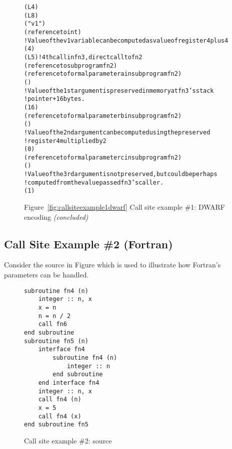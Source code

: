 \begin{figure}
\begin{dwflisting}
\begin{alltt}
\DWTAGlexicalblock
    \DWATlowpc(L4)
    \DWAThighpc(L8)
    \DWTAGvariable
        \DWATname("v1")
        \DWATtype(reference to int)
        ! Value of the v1 variable can be computed as value of register 4 plus 4
        \DWATlocation(\DWOPbregfour{} 4 \DWOPstackvalue)
    \DWTAGcallsite
        \DWATcallreturnpc(L5) ! 4th call in fn3, direct call to fn2
        \DWATcalltarget(reference to subprogram fn2)
        \DWTAGcallsiteparameter
            \DWATcallparameter(reference to formal parameter a in subprogram fn2)
            \DWATlocation(\DWOPregzero)
            ! Value of the 1st argument is preserved in memory at fn3's stack 
            !   pointer + 16 bytes.
            \DWATcallvalue(\DWOPbregthree{} 16 \DWOPderef)
        \DWTAGcallsiteparameter
            \DWATcallparameter(reference to formal parameter b in subprogram fn2)
            \DWATlocation(\DWOPregone)
            ! Value of the 2nd argument can be computed using the preserved 
            !   register 4 multiplied by 2
            \DWATcallvalue(\DWOPlittwo{} \DWOPregfour{} 0 \DWOPmul)
        \DWTAGcallsiteparameter
            \DWATcallparameter(reference to formal parameter c in subprogram fn2)
            \DWATlocation(\DWOPregtwo)
            ! Value of the 3rd argument is not preserved, but could be perhaps 
            ! computed from the value passed fn3's caller.
            \DWATcallvalue(\DWOPentryvalue{} 1 \DWOPregzero)
\end{alltt}
\end{dwflisting}
\begin{center}
\vspace{3mm}
Figure~\ref{fig:callsiteexample1dwarf} Call site example \#1: DWARF encoding \textit{(concluded)}
\end{center}
\end{figure}

\clearpage
\subsection{Call Site Example \#2 (Fortran)}
Consider the  source in 
Figure 
which is used to illustrate how Fortran's 
parameters can be handled.

\begin{figure}[h]
\begin{lstlisting}
subroutine fn4 (n)
    integer :: n, x
    x = n
    n = n / 2
    call fn6
end subroutine
subroutine fn5 (n)
    interface fn4
        subroutine fn4 (n)
            integer :: n
        end subroutine
    end interface fn4
    integer :: n, x
    call fn4 (n)
    x = 5
    call fn4 (x)
end subroutine fn5
\end{lstlisting}
\caption{Call site example \#2: source}
\label{fig:callsiteexample2source}
\end{figure}

